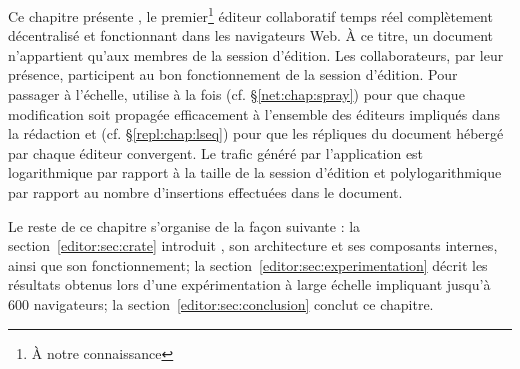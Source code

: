 Ce chapitre présente \CRATE, le premier\footnote{À notre connaissance} éditeur
collaboratif temps réel complètement décentralisé et fonctionnant dans les
navigateurs Web. À ce titre, un document n'appartient qu'aux membres de la
session d'édition. Les collaborateurs, par leur présence, participent au bon
fonctionnement de la session d'édition. Pour passager à l'échelle, \CRATE
utilise à la fois \SPRAY (cf. §\ref{net:chap:spray}) pour que chaque
modification soit propagée efficacement à l'ensemble des éditeurs impliqués dans
la rédaction et \LSEQ (cf. §\ref{repl:chap:lseq}) pour que les répliques du
document hébergé par chaque éditeur convergent. Le trafic généré par
l'application est logarithmique par rapport à la taille de la session d'édition
et polylogarithmique par rapport au nombre d'insertions effectuées dans le
document.

Le reste de ce chapitre s'organise de la façon suivante : 
la section~\ref{editor:sec:crate} introduit \CRATE, son architecture et ses
composants internes, ainsi que son fonctionnement; la
section~\ref{editor:sec:experimentation} décrit les résultats obtenus lors d'une
expérimentation à large échelle impliquant jusqu'à 600 navigateurs; la
section~\ref{editor:sec:conclusion} conclut ce chapitre.


